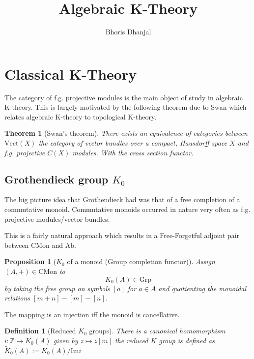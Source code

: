\documentclass[12pt]{article}
\title{Algebraic K-Theory}
\author{Bhoris Dhanjal}
\numberwithin{equation}{section}
\newcommand{\Z}{\mathbb{Z}}
\newcommand{\image}{{\mathrm{Im}}}
\newcounter{dummy} \numberwithin{dummy}{section}
\newtheorem{theorem}[dummy]{Theorem}
\newtheorem{definition}[dummy]{Definition}
\newtheorem{proposition}[dummy]{Proposition}
\begin{document}
	\tableofcontents
	\maketitle
	\section{Classical K-Theory}
	The category of f.g. projective modules is the main object of study in algebraic K-theory. This is largely motivated by the following theorem due to Swan \cite{Swan1962} which relates algebraic K-theory to topological K-theory.
	\begin{theorem}[Swan's theorem]
		There exists an equivalence of categories between $\mathrm{Vect}(X)$ the category of vector bundles over a compact, Hausdorff space $X$ and f.g. projective $C(X)$ modules. With the cross section functor.
	\end{theorem}
	
	\subsection{Grothendieck group $K_0$}
	The big picture idea that Grothendieck had was that of a free completion of a commutative monoid. Commutative monoids occurred in nature very often as f.g. projective modules/vector bundles. 
	
	This is a fairly natural approach which results in a Free-Forgetful adjoint pair between $\mathrm{CMon}$ and $\mathrm{Ab}$. 
		
	\begin{proposition}[$K_0$ of a monoid (Group completion functor)]
		Assign $(A,+) \in \mathrm{CMon} $ to \[K_0(A) \in \mathrm{Grp}\] by taking the free group on symbols $[a]$ for $a \in A$ and quotienting the monoidal relations $[m+n]-[m]-[n]$.
	\end{proposition}
	
	The mapping is an injection iff the monoid is cancellative.
	\begin{definition}[Reduced $K_0$ groups]
	There is a canonical homomorphism $i: \Z \to K_0(A)$ given by $z \mapsto z[m]$ the reduced $K$ group is defined as $\tilde{K}_0(A):=K_0(A)/\image i $
	\end{definition}
	
\end{document}
